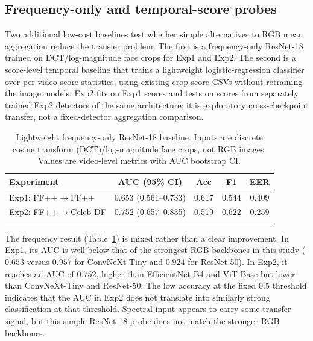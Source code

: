 \subsection{Frequency-only and temporal-score probes}
Two additional low-cost baselines test whether simple alternatives to RGB mean aggregation reduce the transfer problem. The first is a frequency-only ResNet-18 trained on DCT/log-magnitude face crops for Exp1 and Exp2. The second is a score-level temporal baseline that trains a lightweight logistic-regression classifier over per-video score statistics, using existing crop-score CSVs without retraining the image models. Exp2 fits on Exp1 scores and tests on scores from separately trained Exp2 detectors of the same architecture; it is exploratory cross-checkpoint transfer, not a fixed-detector aggregation comparison.

\begin{table}[!htbp]
\caption{Lightweight frequency-only ResNet-18 baseline. Inputs are discrete cosine transform (DCT)/log-magnitude face crops, not RGB images. Values are video-level metrics with AUC bootstrap CI.}
\centering
\small
\setlength{\tabcolsep}{3pt}
\begin{tabular}{l c c c c}
\toprule
\textbf{Experiment} & \textbf{AUC (95\% CI)} & \textbf{Acc} & \textbf{F1} & \textbf{EER} \\
\midrule
Exp1: FF++$\to$FF++ & 0.653 (0.561--0.733) & 0.617 & 0.544 & 0.409 \\
Exp2: FF++$\to$Celeb-DF & 0.752 (0.657--0.835) & 0.519 & 0.622 & 0.259 \\
\botrule
\end{tabular}
\label{tab:freq_resnet18}
\end{table}

The frequency result (Table~\ref{tab:freq_resnet18}) is mixed rather than a clear improvement. In Exp1, its AUC is well below that of the strongest RGB backbones in this study ($0.653$ versus $0.957$ for ConvNeXt-Tiny and $0.924$ for ResNet-50). In Exp2, it reaches an AUC of $0.752$, higher than EfficientNet-B4 and ViT-Base but lower than ConvNeXt-Tiny and ResNet-50. The low accuracy at the fixed $0.5$ threshold indicates that the AUC in Exp2 does not translate into similarly strong classification at that threshold. Spectral input appears to carry some transfer signal, but this simple ResNet-18 probe does not match the stronger RGB backbones.

